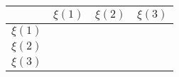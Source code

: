 \documentclass{article}
\begin{document}
\begin{tabular}{ |c|c|c|c| }
  \hline
  & $\xi(1)$ & $\xi(2)$ & $\xi{}(3)$ \\
  \hline
  $\xi(1)$ & & & \\
  \hline
  $\xi(2)$ & & & \\
  \hline
  $\xi(3)$ & & & \\
  \hline
\end{tabular}
\end{document}
